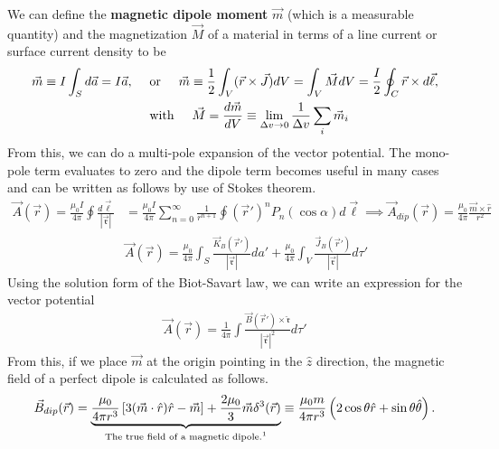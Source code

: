 We can define the \textbf{magnetic dipole moment} $\vec{m}$ (which is a measurable quantity) and the magnetization $\vec{M}$ of a material in terms of a line current or surface current density to be
\begin{align}
	\vec{m} \equiv I \int_S d\vec{a} = I\vec{a}, \hspace{0.5cm}&\textrm{or}\hspace{0.5cm} \vec{m} \equiv \frac{1}{2}\int_V(\vec{r}\times \vec{J})dV= \int_V \vec{M}  dV = \frac{I}{2}\oint_C \vec{r}\times d\vec{\ell}, \\ &\textrm{with}\hspace{0.5cm} \vec{M} = \frac{d\vec{m}}{dV} \equiv \lim\limits_{\Delta v \rightarrow 0}\frac{1}{\Delta v}\sum_{i}\vec{m}_i 
\end{align} 
From this, we can do a multi-pole expansion of the vector potential. The mono-pole term evaluates to zero and the dipole term becomes useful in many cases and can be written as follows by use of Stokes theorem.
\begin{align}
	\vec{A}(\vec{r}) = \frac{\mu_0 I}{4\pi}\oint\frac{d\vec{\ell}}{|\vec{\mathfrak{r}}|} &= \frac{\mu_0 I}{4\pi}\sum_{n=0}^{\infty}\frac{1}{r^{n+1}}\oint(\vec{r}')^nP_n(\cos\alpha)
	d\vec{\ell}\implies \vec{A}_{dip}(\vec{r}) = \frac{\mu_0}{4\pi}\frac{\vec{m}\times\hat{r}}{r^2} \\
	&\vec{A}(\vec{r})=\frac{\mu_0}{4\pi}\int_S\frac{\vec{K}_B(\vec{r}')}{|\vec{\mathfrak{r}}|}da'+\frac{\mu_0}{4\pi}\int_V\frac{\vec{J}_B(\vec{r}')}{|\vec{\mathfrak{r}}|}d\tau'
\end{align}
Using the solution form of the Biot-Savart law, we can write an expression for the vector potential
\begin{align}
	\vec{A}(\vec{r}) = \frac{1}{4\pi}\int\frac{\vec{B}(\vec{r}')\times \hat{\mathfrak{r}}}{|\vec{\mathfrak{r}}|^2}d\tau'
\end{align}
From this, if we place $\vec{m}$ at the origin pointing in the $\hat{z}$ direction, the magnetic field of a perfect dipole is calculated as follows. 
\begin{align}
	\vec{B}_{dip}(\vec{r}) = \underbrace{\frac{\mu_0}{4\pi r^3}\left[3(\vec{m}\cdot \hat{r})\hat{r}-\vec{m}\right]+\frac{2\mu_0}{3}\vec{m}\delta^3(\vec{r})}_{\textrm{The true field of a magnetic dipole.\footnotemark}} \equiv \frac{\mu_0 m}{4\pi r^3}\left(2\cos\theta\hat{r}+\sin\theta\hat{\theta}\right).
\end{align}
